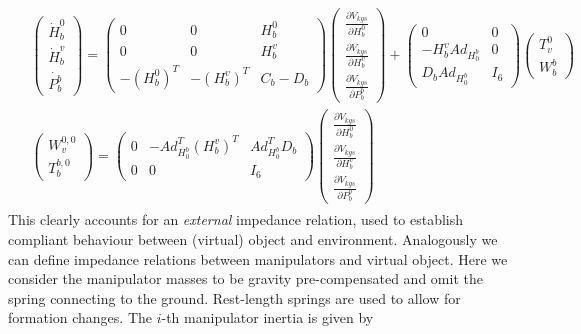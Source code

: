 \documentclass[a4paper,twoside, openright,12pt]{report}
\begin{document}
\begin{eqnarray} \label{EQ:externalimpedance}
\begin{aligned}
&\begin{pmatrix}\dot{H}_b^0 \\ \dot{H}_b^v \\  \dot{P_b^b}\end{pmatrix} =
\begin{pmatrix} 0 & 0 & H_b^0  \\ 0 & 0 & H_b^v \\
- (H_b^0)^T & -(H_b^v)^T & C_b-D_b\end{pmatrix}
\begin{pmatrix}\frac{\partial V_{kgs}}{\partial H_b^0}\\ \frac{\partial V_{kgs}}{\partial H_b^v} \\ \frac{\partial V_{kgs}}{\partial P_b^b}\end{pmatrix}+
\begin{pmatrix} 0 & 0\\ -H_b^v Ad_{H_0^b} & 0 \\ D_b Ad_{H_0^b} & I_6 \end{pmatrix}\begin{pmatrix} T_v^0 \\ W_{b}^b\end{pmatrix} \\
&\begin{pmatrix}W_v^{0,0} \\ T_b^{b,0}\end{pmatrix} = \begin{pmatrix}0 & -Ad_{H_0^b}^T (H_b^v)^T & Ad_{H_0^b}^T D_b\\ 0 & 0 & I_6 \end{pmatrix}
\begin{pmatrix}\frac{\partial V_{kgs}}{\partial H_b^0}\\ \frac{\partial V_{kgs}}{\partial H_b^v} \\ \frac{\partial V_{kgs}}{\partial P_b^b}\end{pmatrix}
\end{aligned}
\end{eqnarray}
This clearly accounts for an \emph{external} impedance relation, used to establish compliant behaviour between (virtual) object and environment. Analogously we can define impedance relations between manipulators and virtual object. Here we consider the manipulator masses to be gravity pre-compensated and omit the spring connecting to the ground. Rest-length springs are used to allow for formation changes. The $i$-th manipulator inertia is given by
\end{document}

